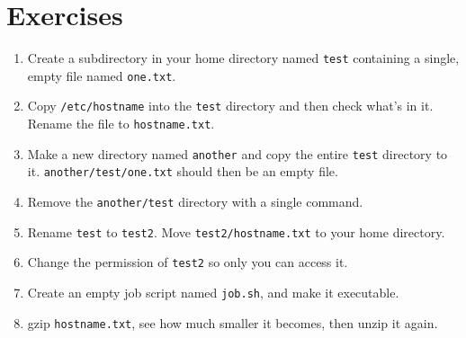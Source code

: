\begin{prompt}
\end{prompt}

\section{Exercises}

\begin{enumerate}
    \item Create a subdirectory in your home directory named \verb|test| containing
        a single, empty file named \verb|one.txt|.
    \item Copy \verb|/etc/hostname| into the \verb|test| directory and then check what's
        in it. Rename the file to \verb|hostname.txt|.
    \item Make a new directory named \verb|another| and copy the entire \verb|test|
        directory to it. \verb|another/test/one.txt| should then be an empty file.
    \item Remove the \verb|another/test| directory with a single command.
    \item Rename \verb|test| to \verb|test2|. Move \verb|test2/hostname.txt| to your
        home directory.
    \item Change the permission of \verb|test2| so only you can access it.
    \item Create an empty job script named \verb|job.sh|, and make it executable.
    \item gzip \verb|hostname.txt|, see how much smaller it becomes, then unzip it again.
\end{enumerate}
